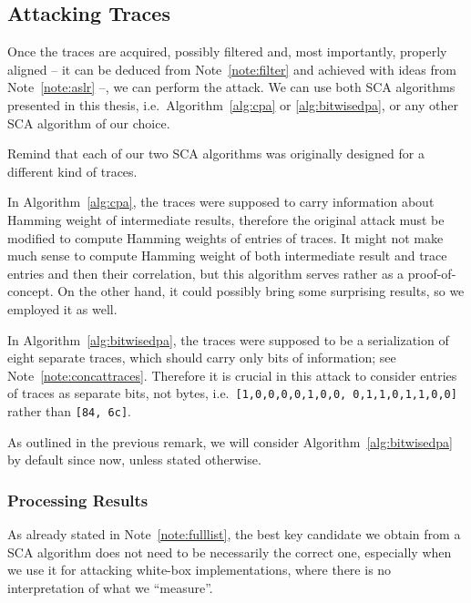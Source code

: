 
\subsection{Attacking Traces}
\label{sec:attack}

Once the traces are acquired, possibly filtered and, most importantly, properly aligned -- it can be deduced from Note~\ref{note:filter} and achieved with ideas from Note~\ref{note:aslr} --, we can perform the attack. We can use both SCA algorithms presented in this thesis, i.e.\ Algorithm~\ref{alg:cpa} or \ref{alg:bitwisedpa}, or any other SCA algorithm of our choice.

\begin{remark}
\label{rem:traceformat}
	Remind that each of our two SCA algorithms was originally designed for a different kind of traces.
	
	In Algorithm~\ref{alg:cpa}, the traces were supposed to carry information about Hamming weight of intermediate results, therefore the original attack must be modified to compute Hamming weights of entries of traces. It might not make much sense to compute Hamming weight of both intermediate result and trace entries and then their correlation, but this algorithm serves rather as a proof-of-concept. On the other hand, it could possibly bring some surprising results, so we employed it as well.
	
	In Algorithm~\ref{alg:bitwisedpa}, the traces were supposed to be a serialization of eight separate traces, which should carry only bits of information; see Note~\ref{note:concattraces}. Therefore it is crucial in this attack to consider entries of traces as separate bits, not bytes, i.e.\ {\tt [1,0,0,0,0,1,0,0, 0,1,1,0,1,1,0,0]} rather than {\tt [84, 6c]}.
\end{remark}

As outlined in the previous remark, we will consider Algorithm~\ref{alg:bitwisedpa} by default since now, unless stated otherwise.

\subsubsection{Processing Results}
	
	As already stated in Note~\ref{note:fulllist}, the best key candidate we obtain from a SCA algorithm does not need to be necessarily the correct one, especially when we use it for attacking white-box implementations, where there is no interpretation of what we ``measure''.
	
